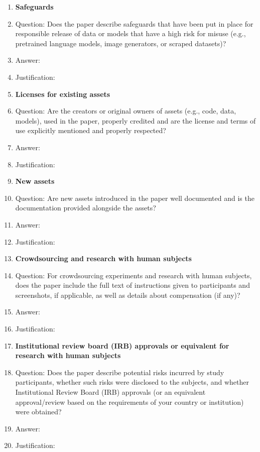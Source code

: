 \documentclass{article}
\begin{document}
\begin{enumerate}
\item {\bf Safeguards}
    \item[] Question: Does the paper describe safeguards that have been put in place for responsible release of data or models that have a high risk for misuse (e.g., pretrained language models, image generators, or scraped datasets)?
    \item[] Answer: \answerTODO{} %
    \item[] Justification: \justificationTODO{}

\item {\bf Licenses for existing assets}
    \item[] Question: Are the creators or original owners of assets (e.g., code, data, models), used in the paper, properly credited and are the license and terms of use explicitly mentioned and properly respected?
    \item[] Answer: \answerTODO{} %
    \item[] Justification: \justificationTODO{}

\item {\bf New assets}
    \item[] Question: Are new assets introduced in the paper well documented and is the documentation provided alongside the assets?
    \item[] Answer: \answerTODO{} %
    \item[] Justification: \justificationTODO{}

\item {\bf Crowdsourcing and research with human subjects}
    \item[] Question: For crowdsourcing experiments and research with human subjects, does the paper include the full text of instructions given to participants and screenshots, if applicable, as well as details about compensation (if any)?
    \item[] Answer: \answerTODO{} %
    \item[] Justification: \justificationTODO{}

\item {\bf Institutional review board (IRB) approvals or equivalent for research with human subjects}
    \item[] Question: Does the paper describe potential risks incurred by study participants, whether such risks were disclosed to the subjects, and whether Institutional Review Board (IRB) approvals (or an equivalent approval/review based on the requirements of your country or institution) were obtained?
    \item[] Answer: \answerTODO{} %
    \item[] Justification: \justificationTODO{}


\end{enumerate}
\end{document}
